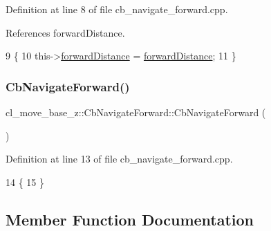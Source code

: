Definition at line 8 of file cb\+\_\+navigate\+\_\+forward.\+cpp.



References forward\+Distance.


\begin{DoxyCode}
9 \{
10     this->\hyperlink{classcl__move__base__z_1_1CbNavigateForward_a41bc9c319c64be6302f7365173ccd2c5}{forwardDistance} = \hyperlink{classcl__move__base__z_1_1CbNavigateForward_a41bc9c319c64be6302f7365173ccd2c5}{forwardDistance};
11 \}
\end{DoxyCode}
\mbox{\label{classcl__move__base__z_1_1CbNavigateForward_a6322be3ee8a23652a0a9dbe8e203d00e}} 
\subsubsection{\texorpdfstring{Cb\+Navigate\+Forward()}{CbNavigateForward()}\hspace{0.1cm}{\footnotesize\ttfamily [2/2]}}
{\footnotesize\ttfamily cl\+\_\+move\+\_\+base\+\_\+z\+::\+Cb\+Navigate\+Forward\+::\+Cb\+Navigate\+Forward (\begin{DoxyParamCaption}{ }\end{DoxyParamCaption})}



Definition at line 13 of file cb\+\_\+navigate\+\_\+forward.\+cpp.


\begin{DoxyCode}
14 \{
15 \}
\end{DoxyCode}


\subsection{Member Function Documentation}
\mbox{\label{classcl__move__base__z_1_1CbNavigateForward_af9a2e49071de287922c3f5963a079b95}} 
